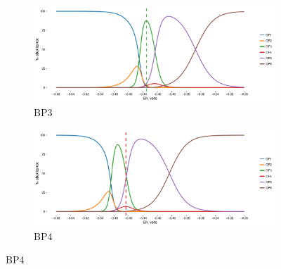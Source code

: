{\begin{figure}[h]
    \begin{subfigure}[b]{\linewidth}
      	\includegraphics[width=1\linewidth]{"figs_ch2/Bison OF3_thermo"}
      	\caption{BP3}
        \label{fig:BP3_thermo}
    \end{subfigure}
    \begin{subfigure}[b]{\linewidth}
    	\includegraphics[width=1\linewidth]{"figs_ch2/Bison OF4_thermo"}
    	\caption{BP4}
        \label{fig:BP4_thermo}
    \end{subfigure}
    
\end{figure}

\newpage

\begin{figure}[h]\ContinuedFloat


\end{figure}}

